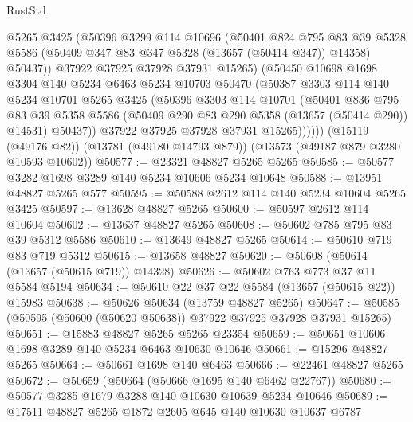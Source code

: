 \begin{lexlean}{RustStd}
\begin{coremodule}
              @5265
              @3425
              (@50396
                @3299
                @114
                @10696
                (@50401
                  @824
                  @795
                  @83
                  @39
                  @5328
                  @5586
                  (@50409 @347 @83 @347 @5328 (@13657 (@50414 @347)) @14358)
                  @50437))
              @37922
              @37925
              @37928
              @37931
              @15265)
            (@50450
              @10698
              @1698
              @3304
              @140
              @5234
              @6463
              @5234
              @10703
              @50470
              (@50387
                @3303
                @114
                @140
                @5234
                @10701
                @5265
                @3425
                (@50396
                  @3303
                  @114
                  @10701
                  (@50401
                    @836
                    @795
                    @83
                    @39
                    @5358
                    @5586
                    (@50409 @290 @83 @290 @5358 (@13657 (@50414 @290)) @14531)
                    @50437))
                @37922
                @37925
                @37928
                @37931
                @15265))))))
    (@15119 (@49176 @82))
    (@13781 (@49180 @14793 @879))
    (@13573 (@49187 @879 @3280 @10593 @10602))
@50577 := @23321 @48827 @5265 @5265
@50585 := @50577 @3282 @1698 @3289 @140 @5234 @10606 @5234 @10648
@50588 := @13951 @48827 @5265 @577
@50595 := @50588 @2612 @114 @140 @5234 @10604 @5265 @3425
@50597 := @13628 @48827 @5265
@50600 := @50597 @2612 @114 @10604
@50602 := @13637 @48827 @5265
@50608 := @50602 @785 @795 @83 @39 @5312 @5586
@50610 := @13649 @48827 @5265
@50614 := @50610 @719 @83 @719 @5312
@50615 := @13658 @48827
@50620 := @50608 (@50614 (@13657 (@50615 @719)) @14328)
@50626 := @50602 @763 @773 @37 @11 @5584 @5194
@50634 := @50610 @22 @37 @22 @5584 (@13657 (@50615 @22)) @15983
@50638 := @50626 @50634 (@13759 @48827 @5265)
@50647 := @50585 (@50595 (@50600 (@50620 @50638)) @37922 @37925 @37928 @37931 @15265)
@50651 := @15883 @48827 @5265 @5265 @23354
@50659 := @50651 @10606 @1698 @3289 @140 @5234 @6463 @10630 @10646
@50661 := @15296 @48827 @5265
@50664 := @50661 @1698 @140 @6463
@50666 := @22461 @48827 @5265
@50672 := @50659 (@50664 (@50666 @1695 @140 @6462 @22767))
@50680 := @50577 @3285 @1679 @3288 @140 @10630 @10639 @5234 @10646
@50689 := @17511 @48827 @5265 @1872 @2605 @645 @140 @10630 @10637 @6787

\end{coremodule}
\end{lexlean}
